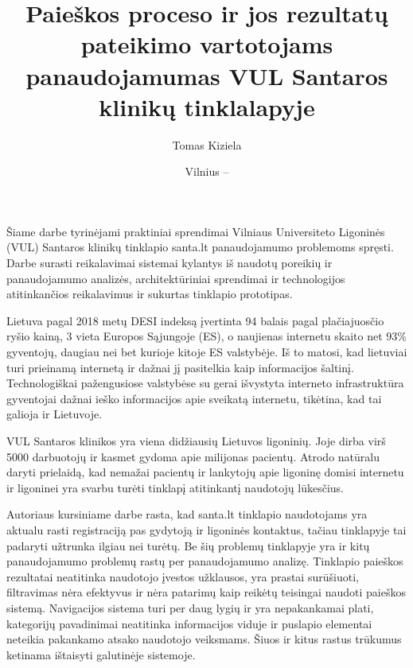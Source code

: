 \documentclass{VUMIFPSkursinis}
\title{Paieškos proceso ir jos rezultatų pateikimo vartotojams panaudojamumas VUL Santaros klinikų tinklalapyje}
\author{Tomas Kiziela}
\date{Vilnius – \the\year}
\begin{document}
	
\maketitle
\cleardoublepage{}
\setcounter{page}{2}

\tableofcontents



Šiame darbe tyrinėjami praktiniai sprendimai Vilniaus Universiteto Ligoninės (VUL) Santaros klinikų tinklapio santa.lt panaudojamumo problemoms spręsti. Darbe surasti reikalavimai sistemai kylantys iš naudotų poreikių ir panaudojamumo analizės, architektūriniai sprendimai ir technologijos atitinkančios reikalavimus ir sukurtas tinklapio prototipas.

Lietuva pagal 2018 metų DESI indeksą įvertinta 94 balais pagal plačiajuosčio ryšio kainą, 3 vieta Europos Sąjungoje (ES), o naujienas internetu skaito net 93\% gyventojų, daugiau nei bet kurioje kitoje ES valstybėje\cite{InternetasLt}. Iš to matosi, kad lietuviai turi prieinamą internetą ir dažnai jį pasitelkia kaip informacijos šaltinį. Technologiškai pažengusiose valstybėse su gerai išvystyta interneto infrastruktūra gyventojai dažnai ieško informacijos apie sveikatą internetu\cite{InternetUseByPublicSAEn}\cite{InternetUseByPublicHKEn}, tikėtina, kad tai galioja ir Lietuvoje.

VUL Santaros klinikos yra viena didžiausių Lietuvos ligoninių. Joje dirba virš 5000 darbuotojų ir kasmet gydoma apie milijonas pacientų\cite{VulSkApieMusLt}. Atrodo natūralu daryti prielaidą, kad nemažai pacientų ir lankytojų apie ligoninę domisi internetu ir ligoninei yra svarbu turėti tinklapį atitinkantį naudotojų lūkesčius.

Autoriaus kursiniame darbe rasta, kad santa.lt tinklapio naudotojams yra aktualu rasti registraciją pas gydytoją ir ligoninės kontaktus, tačiau tinklapyje tai padaryti užtrunka ilgiau nei turėtų\cite{Kursinis}. Be šių problemų tinklapyje yra ir kitų panaudojamumo problemų rastų per panaudojamumo analizę. Tinklapio paieškos rezultatai neatitinka naudotojo įvestos užklausos, yra prastai surūšiuoti, filtravimas nėra efektyvus ir nėra patarimų kaip reikėtų teisingai naudoti paieškos sistemą. Navigacijos sistema turi per daug lygių ir yra nepakankamai plati, kategorijų pavadinimai neatitinka informacijos viduje ir puslapio elementai neteikia pakankamo atsako naudotojo veiksmams. Šiuos ir kitus rastus trūkumus ketinama ištaisyti galutinėje sistemoje.
\end{document}
